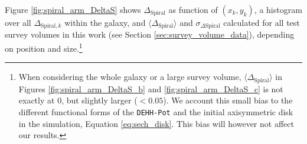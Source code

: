 \documentclass[iop,revtex4,numberedappendix,appendixfloats]{emulateapj}
\begin{document}
Figure \ref{fig:spiral_arm_DeltaS} shows $\Delta_\text{Spiral}$ as function of $(x_k,y_k)$, a histogram over all $\Delta_{\text{Spiral},k}$ within the galaxy, and $\langle \Delta_\text{Spiral} \rangle$ and $\sigma_{\Delta\text{Spiral}}$ calculated for all test survey volumes in this work (see Section \ref{sec:survey_volume_data}), depending on position and size.\footnote{When considering the whole galaxy or a large survey volume, $\langle \Delta_\text{Spiral} \rangle$ in Figures \ref{fig:spiral_arm_DeltaS_b} and \ref{fig:spiral_arm_DeltaS_c} is not exactly at $0$, but slightly larger ($<0.05$). We account this small bias to the different functional forms of the \texttt{DEHH-Pot} and the initial axisymmetric disk in the simulation, Equation \eqref{eq:sech_disk}. This bias will however not affect our results.}

\end{document}
